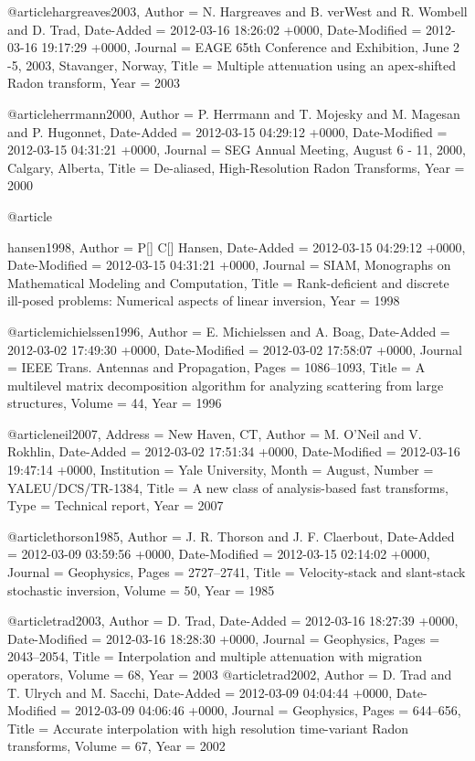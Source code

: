 @article{hargreaves2003,
	Author = {N. Hargreaves and B. verWest and R. Wombell and D. Trad},
	Date-Added = {2012-03-16 18:26:02 +0000},
	Date-Modified = {2012-03-16 19:17:29 +0000},
	Journal = {EAGE 65th Conference and Exhibition, June 2 -5, 2003, Stavanger, Norway},
	Title = {Multiple attenuation using an apex-shifted {R}adon transform},
	Year = {2003}}

@article{herrmann2000,
	Author = {P. Herrmann and T. Mojesky and M. Magesan and P. Hugonnet},
	Date-Added = {2012-03-15 04:29:12 +0000},
	Date-Modified = {2012-03-15 04:31:21 +0000},
	Journal = {SEG Annual Meeting, August 6 - 11, 2000, Calgary, Alberta},
	Title = {De-aliased, High-Resolution {R}adon Transforms},
	Year = {2000}}

@article{hansen1998,
	Author = {P[] C[] Hansen,
	Date-Added = {2012-03-15 04:29:12 +0000},
	Date-Modified = {2012-03-15 04:31:21 +0000},
	Journal = {SIAM, Monographs on Mathematical Modeling and Computation},
	Title = {Rank-deficient and discrete ill-posed problems: Numerical aspects of linear inversion},
	Year = {1998}}

@article{michielssen1996,
	Author = {E. Michielssen and A. Boag},
	Date-Added = {2012-03-02 17:49:30 +0000},
	Date-Modified = {2012-03-02 17:58:07 +0000},
	Journal = {IEEE Trans. Antennas and Propagation},
	Pages = {1086--1093},
	Title = {A multilevel matrix decomposition algorithm for analyzing scattering from large structures},
	Volume = {44},
	Year = {1996}}

@article{neil2007,
	Address = {New Haven, CT},
	Author = {M. O'Neil and V. Rokhlin},
	Date-Added = {2012-03-02 17:51:34 +0000},
	Date-Modified = {2012-03-16 19:47:14 +0000},
	Institution = {Yale University},
	Month = {August},
	Number = {YALEU/DCS/TR-1384},
	Title = {A new class of analysis-based fast transforms},
	Type = {Technical report},
	Year = {2007}}

@article{thorson1985,
	Author = {J. R. Thorson and J. F. Claerbout},
	Date-Added = {2012-03-09 03:59:56 +0000},
	Date-Modified = {2012-03-15 02:14:02 +0000},
	Journal = {Geophysics},
	Pages = {2727--2741},
	Title = {Velocity-stack and slant-stack stochastic inversion},
	Volume = {50},
	Year = {1985}}

@article{trad2003,
	Author = {D. Trad},
	Date-Added = {2012-03-16 18:27:39 +0000},
	Date-Modified = {2012-03-16 18:28:30 +0000},
	Journal = {Geophysics},
	Pages = {2043--2054},
	Title = {Interpolation and multiple attenuation with migration operators},
	Volume = {68},
	Year = {2003}}
@article{trad2002,
	Author = {D. Trad and T. Ulrych and M. Sacchi},
	Date-Added = {2012-03-09 04:04:44 +0000},
	Date-Modified = {2012-03-09 04:06:46 +0000},
	Journal = {Geophysics},
	Pages = {644--656},
	Title = {Accurate interpolation with high resolution time-variant {R}adon transforms},
	Volume = {67},
	Year = {2002}}

}
